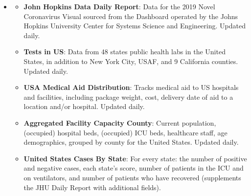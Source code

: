 \documentclass[11pt]{article}
\newcommand{\MYhref}[3][blue]{\href{#2}{\color{#1}{#3}}}%
\begin{document}
\begin{itemize}
    \item \MYhref{https://www.npmjs.com/package/covid19-api}{Covid-19 API}
        \begin{itemize}
        \item \textbf{John Hopkins Data Daily Report}: Data for the 2019 Novel Coronavirus Visual sourced from the Dashboard operated by the Johns Hopkins University Center for Systems Science and Engineering. Updated daily.
        \item \textbf{Tests in US}: Data from 48 states public health labs in the United States, in addition to New York City, USAF, and 9 California counties. Updated daily.
        \item \textbf{USA Medical Aid Distribution}: Tracks medical aid to US hospitals and facilities, including package weight, cost, delivery date of aid to a location and/or hospital. Updated daily.
        \item \textbf{Aggregated Facility Capacity County}: Current population, (occupied) hospital beds, (occupied) ICU beds, healthcare staff, age demographics, grouped by county for the United States. Updated daily.
        \item \textbf{United States Cases By State}: For every state: the number of positive and negative cases, each state's score, number of patients in the ICU and on ventilators, and number of patients who have recovered (supplements the JHU Daily Report with additional fields).
    \end{itemize} 
\end{itemize}
\end{document}
